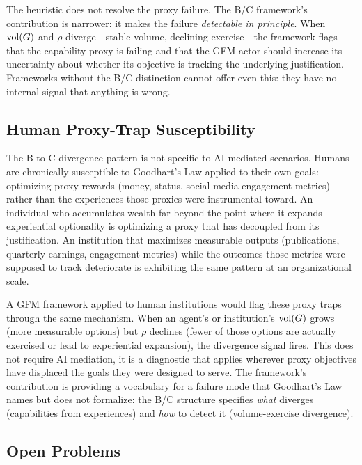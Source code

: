 The heuristic does not resolve the proxy failure. The B/C framework's
contribution is narrower: it makes the failure \emph{detectable in principle}.
When $\operatorname{vol}(G)$ and $\rho$ diverge---stable volume, declining exercise---the
framework flags that the capability proxy is failing and that the GFM actor
should increase its uncertainty about whether its objective is tracking the
underlying justification. Frameworks without the B/C distinction cannot offer
even this: they have no internal signal that anything is wrong.

\subsection{Human Proxy-Trap Susceptibility}
\label{sec:human_proxy_traps}

The B-to-C divergence pattern is not specific to AI-mediated scenarios. Humans
are chronically susceptible to Goodhart's Law applied to their own goals:
optimizing proxy rewards (money, status, social-media engagement metrics)
rather than the experiences those proxies were instrumental toward. An
individual who accumulates wealth far beyond the point where it expands
experiential optionality is optimizing a proxy that has decoupled from its
justification. An institution that maximizes measurable outputs (publications,
quarterly earnings, engagement metrics) while the outcomes those metrics were
supposed to track deteriorate is exhibiting the same pattern at an
organizational scale.

A GFM framework applied to human institutions would flag these proxy traps
through the same mechanism. When an agent's or institution's $\operatorname{vol}(G)$ grows
(more measurable options) but $\rho$ declines (fewer of those options are
actually exercised or lead to experiential expansion), the divergence signal
fires. This does not require AI mediation, it is a diagnostic that applies
wherever proxy objectives have displaced the goals they were designed to serve.
The framework's contribution is providing a vocabulary for a failure mode that
Goodhart's Law names but does not formalize: the B/C structure specifies
\emph{what} diverges (capabilities from experiences) and \emph{how} to detect
it (volume-exercise divergence).

\subsection{Open Problems}
\label{sec:open_problems}

